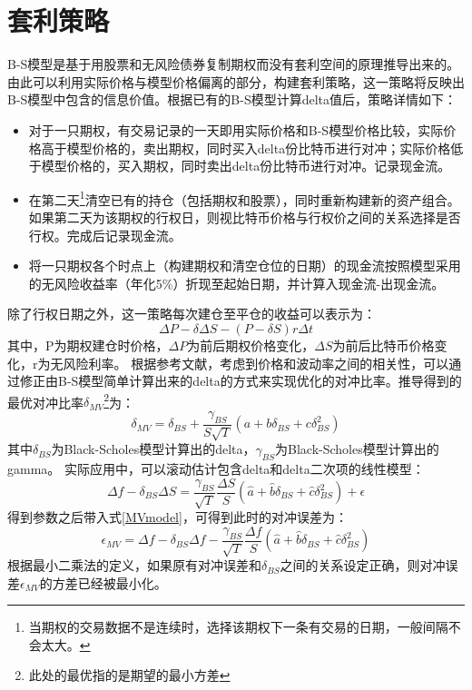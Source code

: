     \section{套利策略}\label{strategy}
    B-S模型是基于用股票和无风险债券复制期权而没有套利空间的原理推导出来的。由此可以利用实际价格与模型价格偏离的部分，构建套利策略，这一策略将反映出B-S模型中包含的信息价值。根据已有的B-S模型计算delta值后，策略详情如下：
    \begin{itemize}
        \item 对于一只期权，有交易记录的一天即用实际价格和B-S模型价格比较，实际价格高于模型价格的，卖出期权，同时买入delta份比特币进行对冲；实际价格低于模型价格的，买入期权，同时卖出delta份比特币进行对冲。记录现金流。
        \item 在第二天\footnote{当期权的交易数据不是连续时，选择该期权下一条有交易的日期，一般间隔不会太大。}清空已有的持仓（包括期权和股票），同时重新构建新的资产组合。如果第二天为该期权的行权日，则视比特币价格与行权价之间的关系选择是否行权。完成后记录现金流。
        \item 将一只期权各个时点上（构建期权和清空仓位的日期）的现金流按照模型采用的无风险收益率（年化5$\%$）折现至起始日期，并计算入现金流-出现金流。
    \end{itemize}
    除了行权日期之外，这一策略每次建仓至平仓的收益可以表示为：
    \begin{equation}
        \Delta{P}-\delta{\Delta{S}}-(P-\delta{S})r\Delta{t}
    \end{equation}
    其中，P为期权建仓时价格，$\Delta{P}$为前后期权价格变化，$\Delta{S}$为前后比特币价格变化，r为无风险利率。
    根据参考文献\cite{Hull-2017}，考虑到价格和波动率之间的相关性，可以通过修正由B-S模型简单计算出来的delta的方式来实现优化的对冲比率。推导得到的最优对冲比率$\delta_{MV}$\footnote{此处的最优指的是期望的最小方差}为：
    \begin{equation}\label{MVmodel}
        \delta_{MV}=\delta_{BS}+\frac{\gamma_{BS}}{S\sqrt{T}}(a+b\delta_{BS}+c\delta^2_{BS})
    \end{equation}
    其中$\delta_{BS}$为Black-Scholes模型计算出的delta，$\gamma_{BS}$为Black-Scholes模型计算出的gamma。
    实际应用中，可以滚动估计包含delta和delta二次项的线性模型：
    \begin{equation}\label{MVreg}
        \Delta{f}-\delta_{BS}\Delta{S}=\frac{\gamma_{BS}}{\sqrt{T}}\frac{\Delta{S}}{S}(\hat{a}+\hat{b}\delta_{BS}+\hat{c}\delta^2_{BS})+\epsilon
    \end{equation}
    得到参数之后带入式\ref{MVmodel}，可得到此时的对冲误差为：
    \begin{equation}
        \epsilon_{MV}=\Delta{f}-\delta_{BS}\Delta{f}-\frac{\gamma_{BS}}{\sqrt{T}}\frac{\Delta{f}}{S}(\hat{a}+\hat{b}\delta_{BS}+\hat{c}\delta^2_{BS})
    \end{equation}
    根据最小二乘法的定义，如果原有对冲误差和$\delta_{BS}$之间的关系设定正确，则对冲误差$\epsilon_{MV}$的方差已经被最小化。
    